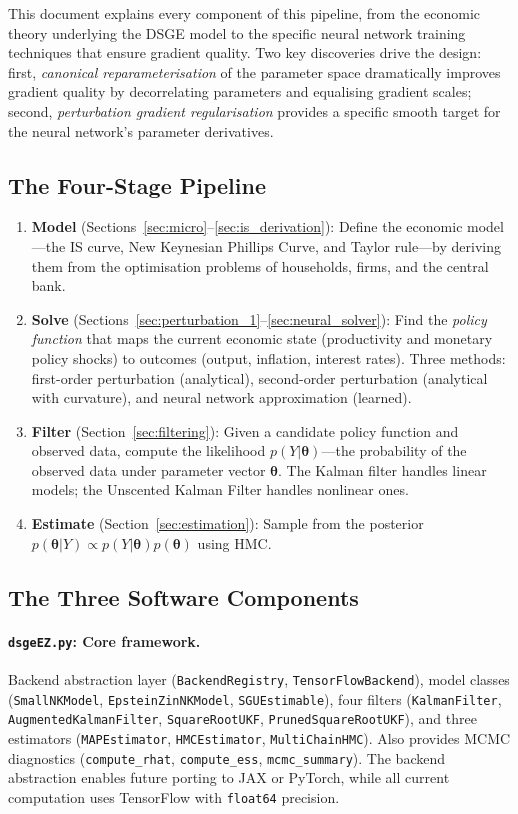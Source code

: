 \documentclass[11pt,a4paper]{article}
\theoremstyle{definition}
\newcommand{\btheta}{\boldsymbol{\theta}}
\newcommand{\code}[1]{\texttt{\color{codecolor}#1}}
\begin{document}
	This document explains every component of this pipeline, from the economic theory underlying the DSGE model to the specific neural network training techniques that ensure gradient quality.
	Two key discoveries drive the design: first, \emph{canonical reparameterisation} of the parameter space dramatically improves gradient quality by decorrelating parameters and equalising gradient scales; second, \emph{perturbation gradient regularisation} provides a specific smooth target for the neural network's parameter derivatives.
	
	\subsection{The Four-Stage Pipeline}
	
	\begin{enumerate}
		\item \textbf{Model} (Sections~\ref{sec:micro}--\ref{sec:is_derivation}): Define the economic model---the IS curve, New Keynesian Phillips Curve, and Taylor rule---by deriving them from the optimisation problems of households, firms, and the central bank.
		\item \textbf{Solve} (Sections~\ref{sec:perturbation_1}--\ref{sec:neural_solver}): Find the \emph{policy function} that maps the current economic state (productivity and monetary policy shocks) to outcomes (output, inflation, interest rates).
		Three methods: first-order perturbation (analytical), second-order perturbation (analytical with curvature), and neural network approximation (learned).
		\item \textbf{Filter} (Section~\ref{sec:filtering}): Given a candidate policy function and observed data, compute the likelihood $p(Y|\btheta)$---the probability of the observed data under parameter vector $\btheta$.
		The Kalman filter handles linear models; the Unscented Kalman Filter handles nonlinear ones.
		\item \textbf{Estimate} (Section~\ref{sec:estimation}): Sample from the posterior $p(\btheta|Y) \propto p(Y|\btheta)p(\btheta)$ using HMC.
	\end{enumerate}
	
	\subsection{The Three Software Components}
	
	\paragraph{\code{dsgeEZ.py}: Core framework.}
	Backend abstraction layer (\code{BackendRegistry}, \code{TensorFlowBackend}), model classes (\code{SmallNKModel}, \code{EpsteinZinNKModel}, \code{SGUEstimable}), four filters (\code{KalmanFilter}, \code{AugmentedKalmanFilter}, \code{SquareRootUKF}, \code{PrunedSquareRootUKF}), and three estimators (\code{MAPEstimator}, \code{HMCEstimator}, \code{MultiChainHMC}).
	Also provides MCMC diagnostics (\code{compute\_rhat}, \code{compute\_ess}, \code{mcmc\_summary}).
	The backend abstraction enables future porting to JAX or PyTorch, while all current computation uses TensorFlow with \code{float64} precision.
	
\end{document}
